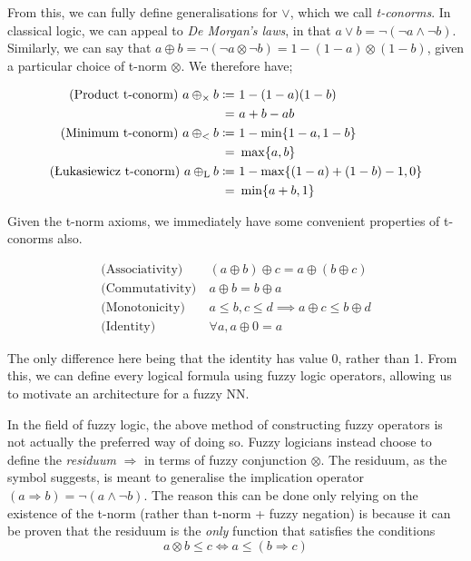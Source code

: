 \documentclass[conference]{report}
\begin{document}
From this, we can fully define generalisations for $\lor$, which we call \textit{t-conorms}. In classical logic, we can appeal to \textit{De Morgan's laws}, in that $a \lor b = \lnot (\lnot a \land \lnot b)$. Similarly, we can say that $a \oplus b = \lnot(\lnot a \otimes \lnot b) = 1 - (1 - a) \otimes (1 - b)$, given a particular choice of t-norm $\otimes$. We therefore have;

$$
\begin{aligned}
    \text{(Product t-conorm)}\ a {\mspace{4mu}\oplus_\times\mspace{4mu}} b \coloneqq &\ 1 - (1-a)(1-b) \\
    = &\ a + b - ab \\
    \text{(Minimum t-conorm)}\ a {\mspace{4mu}\oplus_<\mspace{4mu}} b \coloneqq &\ 1 - \min\{1-a,1-b\} \\
    = &\ \max\{a, b\} \\
    \text{(Łukasiewicz t-conorm)}\ a {\mspace{4mu}\oplus_\text{L}\mspace{4mu}} b \coloneqq &\ 1 - \max\{(1-a)+(1-b)-1,0\} \\
    = &\ \min\{a+b, 1\}
\end{aligned}
$$

Given the t-norm axioms, we immediately have some convenient properties of t-conorms also.

$$
\begin{aligned}
\text{(Associativity)}&\ (a \oplus b) \oplus c = a \oplus (b \oplus c) \\
\text{(Commutativity)}&\ a \oplus b = b \oplus a \\
\text{(Monotonicity)}&\ a \leq b, c \leq d \implies a \oplus c \leq b \oplus d \\
\text{(Identity)}&\ \forall a, a \oplus 0 = a
\end{aligned}
$$

The only difference here being that the identity has value 0, rather than 1. From this, we can define every logical formula using fuzzy logic operators, allowing us to motivate an architecture for a fuzzy NN.

In the field of fuzzy logic, the above method of constructing fuzzy operators is not actually the preferred way of doing so. Fuzzy logicians instead choose to define the \textit{residuum} $\Rightarrow$ in terms of fuzzy conjunction $\otimes$. The residuum, as the symbol suggests, is meant to generalise the implication operator $(a \Rightarrow b) = \lnot(a \land \lnot b)$. The reason this can be done only relying on the existence of the t-norm (rather than t-norm + fuzzy negation) is because it can be proven that the residuum is the \textit{only} function that satisfies the conditions
$$a \otimes b \leq c \iff a \leq (b \Rightarrow c)$$
\end{document}
